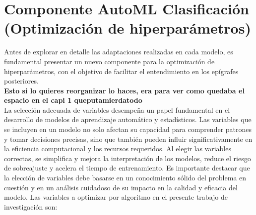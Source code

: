 \section{Componente AutoML Clasificación (Optimización de hiperparámetros)}
Antes de explorar en detalle las adaptaciones realizadas en cada modelo, es fundamental presentar un nuevo componente para la optimización de hiperparámetros, con el objetivo de facilitar el entendimiento en los epígrafes posteriores. \\
\textbf{Esto si lo quieres reorganizar lo haces, era para ver como quedaba el espacio en el capi 1 queputamierdatodo} \\
La selección adecuada de variables desempeña un papel fundamental en el desarrollo de modelos de aprendizaje automático y estadísticos. Las variables que se incluyen en un modelo no solo afectan su capacidad para comprender patrones y tomar decisiones precisas, sino que también pueden influir significativamente en la eficiencia computacional y los recursos requeridos. Al elegir las variables correctas, se simplifica y mejora la interpretación de los modelos, reduce el riesgo de sobreajuste y acelera el tiempo de entrenamiento. Es importante destacar que la elección de variables debe basarse en un conocimiento sólido del problema en cuestión y en un análisis cuidadoso de su impacto en la calidad y eficacia del modelo. Las variables a optimizar por algoritmo en el presente trabajo de investigación son:
